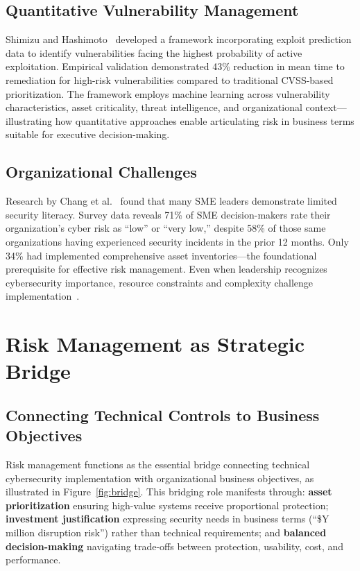 \documentclass[journal]{IEEEtran}
\begin{document}
\subsection{Quantitative Vulnerability Management}

Shimizu and Hashimoto~\cite{shimizu2025vulnerability} developed a framework incorporating
exploit prediction data to identify vulnerabilities facing the highest probability of
active exploitation. Empirical validation demonstrated 43\% reduction in mean time to
remediation for high-risk vulnerabilities compared to traditional CVSS-based
prioritization. The framework employs machine learning across vulnerability
characteristics, asset criticality, threat intelligence, and organizational context---
illustrating how quantitative approaches enable articulating risk in business terms
suitable for executive decision-making.

\subsection{Organizational Challenges}

Research by Chang et al.~\cite{chang2025mind} found that many SME leaders demonstrate
limited security literacy. Survey data reveals 71\% of SME decision-makers rate their
organization's cyber risk as ``low'' or ``very low,'' despite 58\% of those same
organizations having experienced security incidents in the prior 12 months. Only 34\%
had implemented comprehensive asset inventories---the foundational prerequisite for
effective risk management. Even when leadership recognizes cybersecurity importance,
resource constraints and complexity challenge implementation~\cite{campos2025safeguarding}.

\section{Risk Management as Strategic Bridge}

\subsection{Connecting Technical Controls to Business Objectives}

Risk management functions as the essential bridge connecting technical cybersecurity
implementation with organizational business objectives, as illustrated in
Figure~\ref{fig:bridge}. This bridging role manifests through: \textbf{asset
prioritization} ensuring high-value systems receive proportional protection; \textbf{investment
justification} expressing security needs in business terms (``\$Y million disruption
risk'') rather than technical requirements; and \textbf{balanced decision-making}
navigating trade-offs between protection, usability, cost, and performance.
\end{document}
